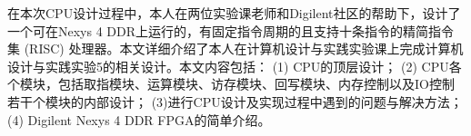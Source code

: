 

\begin{cnabstract}
  在本次CPU设计过程中，本人在两位实验课老师和Digilent社区的帮助下，设计了一个可在Nexys 4 DDR上运行的，有固定指令周期的且支持十条指令的精简指令集 (RISC) 处理器。本文详细介绍了本人在计算机设计与实践实验课上完成计算机设计与实践实验5的相关设计。本文内容包括： (1) CPU的顶层设计； (2) CPU各个模块，包括取指模块、运算模块、访存模块、回写模块、内存控制以及IO控制若干个模块的内部设计； (3)进行CPU设计及实现过程中遇到的问题与解决方法； (4) Digilent Nexys 4 DDR FPGA的简单介绍。

\end{cnabstract}
\par
\vspace*{2em}


